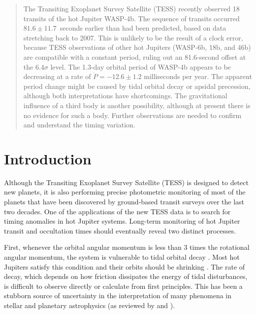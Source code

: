 \documentclass[12pt,twocolumn,tighten]{aastex62}
\begin{document}
\begin{abstract}
    The Transiting Exoplanet Survey Satellite (TESS) recently observed
    18 transits of the hot Jupiter WASP-4b.  The sequence of transits
    occurred $81.6 \pm 11.7$~seconds earlier than had been predicted,
    based on data stretching back to 2007.  This is unlikely to be the
    result of a clock error, because TESS observations of other hot
    Jupiters (WASP-6b, 18b, and 46b) are compatible with a constant
    period, ruling out an 81.6-second offset at the 6.4$\sigma$ level.
    The 1.3-day orbital period of WASP-4b appears to be decreasing at
    a rate of $\dot{P} = -12.6 \pm 1.2$ milliseconds per year.  The
    apparent period change might be caused by tidal orbital decay or
    apsidal precession, although both interpretations have
    shortcomings.  The gravitational influence of a third body is
    another possibility, although at present there is no evidence for
    such a body. Further observations are needed to confirm and
    understand the timing variation.
\end{abstract}



\section{Introduction}
\label{sec:intro}

Although the Transiting Exoplanet Survey Satellite (TESS) is designed
to detect new planets, it is also performing precise photometric
monitoring of most of the planets that have been discovered by
ground-based transit surveys over the last two decades.  One of the
applications of the new TESS data is to search for timing anomalies in
hot Jupiter systems.  Long-term monitoring of hot Jupiter transit and
occultation times should eventually reveal two distinct processes.

First, whenever the orbital angular momentum is less than 3 times the
rotational angular momentum, the system is vulnerable to tidal orbital
decay \citep{counselman_outcomes_1973,hut_stability_1980}.  Most hot
Jupiters satisfy this condition and their orbits should be shrinking
\citep{levrard_falling_2009,matsumura_tidal_2010}.  The rate of decay,
which depends on how friction dissipates the energy of tidal
disturbances, is difficult to observe directly or calculate from first
principles. This has been a stubborn source of uncertainty in the
interpretation of many phenomena in stellar and planetary astrophysics
(as reviewed by \citealt{Mazeh2008} and \citealt{ogilvie_tidal_2014}).
\end{document}
